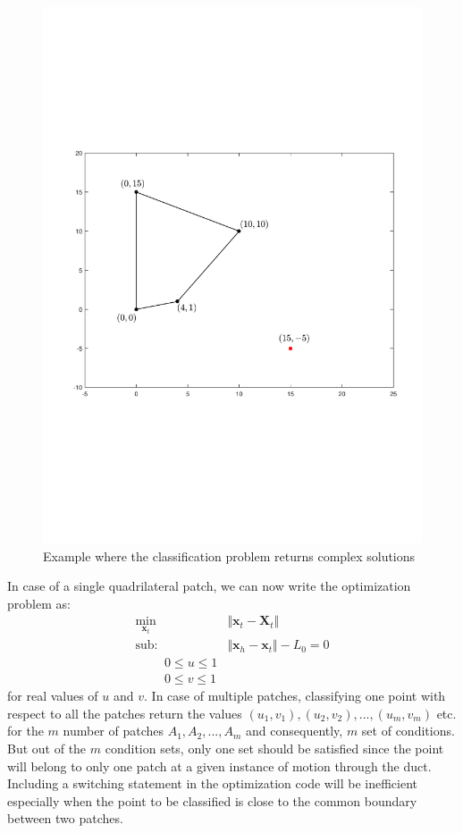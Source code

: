 \documentclass[12pt,a4]{article}
\begin{document}
\begin{figure}[h]
\centering
\includegraphics[scale=0.5]{figures/fig8.pdf}
\caption{Example where the classification problem returns complex solutions\label{fig:complexsolns}}
\end{figure}



 In case of a single quadrilateral patch, we can now write the optimization problem as:
 \begin{align}
 \label{eq:minx,u,v}
\min_{\textbf{x}_t} &\Vert \textbf{x}_t-\textbf{X}_t \Vert\\
\text{sub:~~~} &\Vert \textbf{x}_h - \textbf{x}_t \Vert -L_0 = 0\\
\text{~~~~~~~} 0 \leq u \leq 1\\
\text{~~~~~~~} 0 \leq v \leq 1
\end{align}
for real values of ${u}$ and ${v}$. In case of multiple patches, classifying one point with respect to all the patches return the values $\left({u}_1,{v}_1 \right), \left({u}_2,{v}_2 \right),...,\left({u}_m,{v}_m \right)$ etc. for the $m$ number of patches $A_1, A_2,..., A_m$ and consequently, $m$ set of conditions. But out of the $m$ condition sets, only one set should be satisfied since the point will belong to only one patch at a given instance of motion through the duct. Including a switching  statement in the optimization code will be inefficient especially when the point to be classified is close to the common boundary between two patches. 
\end{document}
